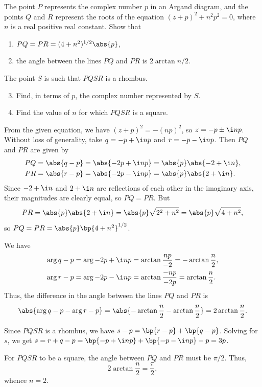 \begin{problem}
    The point $P$ represents the complex number $p$ in an Argand diagram, and the points $Q$ and $R$ represent the roots of the equation $(z + p)^2 + n^2 p^2 = 0$, where $n$ is a real positive real constant. Show that
    \begin{enumerate}
        \item $PQ = PR = (4 + n^2)^{1/2} \abs{p}$,
        \item the angle between the lines $PQ$ and $PR$ is $2\arctan{n/2}$.
    \end{enumerate}

    The point $S$ is such that $PQSR$ is a rhombus.
    \begin{enumerate}
        \setcounter{enumi}{2}
        \item Find, in terms of $p$, the complex number represented by $S$.
        \item Find the value of $n$ for which $PQSR$ is a square.
    \end{enumerate}
\end{problem}
\begin{solution}
    \begin{ppart}
        From the given equation, we have $(z+p)^2 = -(np)^2$, so $z = - p \pm \i n p$. Without loss of generality, take $q = -p + \i n p$ and $r = -p - \i n p$. Then $PQ$ and $PR$ are given by
        \begin{align*}
            PQ &= \abs{q - p} = \abs{-2p + \i np} = \abs{p} \abs{-2 + \i n},\\
            PR &= \abs{r - p} = \abs{-2p - \i n p} = \abs{p} \abs{2 + \i n}.
        \end{align*}
        Since $-2 + \i n$ and $2 + \i n$ are reflections of each other in the imaginary axis, their magnitudes are clearly equal, so $PQ = PR$. But \[PR = \abs{p} \abs{2 + \i n} = \abs{p} \sqrt{2^2 + n^2} = \abs{p} \sqrt{4 + n^2},\] so $PQ = PR = \abs{p} \bp{4 + n^2}^{1/2}$.
    \end{ppart}
    \begin{ppart}
        We have 
        \begin{align*}
            \arg{q - p} &= \arg{-2p + \i n p} = \arctan{\frac{np}{-2}} = - \arctan{\frac{n}{2}},\\
            \arg{r - p} &= \arg{-2p - \i n p} = \arctan{\frac{-np}{-2p}} = \arctan{\frac{n}{2}}.
        \end{align*}
        Thus, the difference in the angle between the lines $PQ$ and $PR$ is \[\abs{\arg{q-p} - \arg{r-p}} = \abs{- \arctan{\frac{n}{2}} - \arctan{\frac{n}{2}}} = 2\arctan{\frac{n}{2}}.\]
    \end{ppart}
    \begin{ppart}
        Since $PQSR$ is a rhombus, we have $s - p = \bp{r - p} + \bp{q - p}$. Solving for $s$, we get $s = r + q - p = \bp{-p + \i n p} + \bp{-p - \i n p} - p = 3p$.
    \end{ppart}
    \begin{ppart}
        For $PQSR$ to be a square, the angle between $PQ$ and $PR$ must be $\pi/2$. Thus, \[2\arctan{\frac{n}{2}} = \frac\pi2,\] whence $n = 2$.
    \end{ppart}
\end{solution}

